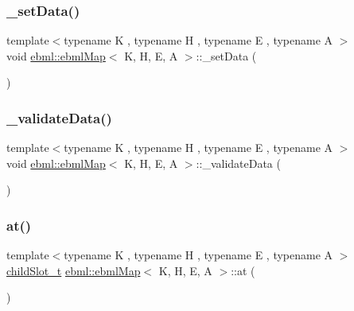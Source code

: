 \subsubsection{\texorpdfstring{\+\_\+set\+Data()}{\_setData()}\hspace{0.1cm}{\footnotesize\ttfamily [4/4]}}
{\footnotesize\ttfamily template$<$typename K , typename H , typename E , typename A $>$ \\
void \mbox{\hyperlink{classebml_1_1ebmlMap}{ebml\+::ebml\+Map}}$<$ K, H, E, A $>$\+::\+\_\+set\+Data (\begin{DoxyParamCaption}\item[{std\+::unordered\+\_\+map$<$ K, \mbox{\hyperlink{namespaceebml_adad533b7705a16bb360fe56380c5e7be}{ebml\+Element\+\_\+sp}}, H, E, A $>$ \&\&}]{ }\end{DoxyParamCaption})\hspace{0.3cm}{\ttfamily [protected]}}

\mbox{\label{classebml_1_1ebmlMap_ad3807a61a0aa3934eca4882a40e1bda9}} 
\subsubsection{\texorpdfstring{\+\_\+validate\+Data()}{\_validateData()}}
{\footnotesize\ttfamily template$<$typename K , typename H , typename E , typename A $>$ \\
void \mbox{\hyperlink{classebml_1_1ebmlMap}{ebml\+::ebml\+Map}}$<$ K, H, E, A $>$\+::\+\_\+validate\+Data (\begin{DoxyParamCaption}\item[{const std\+::list$<$ \mbox{\hyperlink{namespaceebml_adad533b7705a16bb360fe56380c5e7be}{ebml\+Element\+\_\+sp}} $>$ \&}]{ }\end{DoxyParamCaption})\hspace{0.3cm}{\ttfamily [protected]}}

\mbox{\label{classebml_1_1ebmlMap_a0b7124e1c16aa43520e201f42614e70f}} 
\subsubsection{\texorpdfstring{at()}{at()}\hspace{0.1cm}{\footnotesize\ttfamily [1/2]}}
{\footnotesize\ttfamily template$<$typename K , typename H , typename E , typename A $>$ \\
\mbox{\hyperlink{classebml_1_1childSlot__t}{child\+Slot\+\_\+t}} \mbox{\hyperlink{classebml_1_1ebmlMap}{ebml\+::ebml\+Map}}$<$ K, H, E, A $>$\+::at (\begin{DoxyParamCaption}\item[{const K \&}]{ }\end{DoxyParamCaption})}

